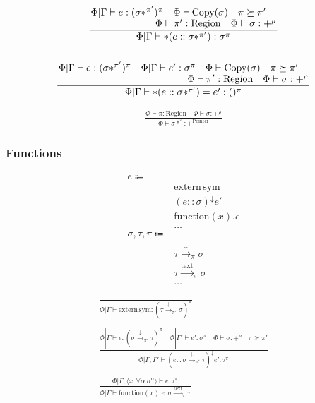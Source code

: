 \documentclass {article}
\begin{document}
\begin{gather*}
\frac
{\splitfrac{\Phi | \Gamma \vdash e : (\sigma *^{\pi'})^\pi \quad \Phi \vdash \text{Copy} (\sigma) \quad \pi \succeq \pi'}
{ \Phi \vdash \pi' : \text{Region} \quad \Phi \vdash \sigma : +^{\rho}}}
{\Phi | \Gamma \vdash * (e :: \sigma *^{\pi'})  : \sigma^\pi} \\
\\
\frac
{\splitfrac{\Phi | \Gamma \vdash e : (\sigma *^{\pi'})^\pi \quad \Phi | \Gamma \vdash e' : \sigma^\pi  \quad \Phi \vdash \text{Copy} (\sigma) \quad \pi \succeq \pi'}
{\Phi \vdash \pi' : \text{Region} \quad \Phi \vdash \sigma : +^{\rho}}}
{\Phi | \Gamma \vdash *(e :: \sigma *^{\pi'}) = e' : ()^\pi }
\end{gather*}

\begin{gather*}
\frac
{\Phi \vdash \pi : \text{Region} \quad \Phi \vdash \sigma : +^{\rho}}
{\Phi \vdash \sigma *^\pi : +^{\text{Pointer}}}
\end{gather*}

\subsubsection{Functions}

\begin{align*}
e \Coloneqq & \\
& \text{extern} \, \text{sym} \tag{Extern Function} \\
& (e :: \sigma) ^\downarrow e' \tag{Function Pointer Application} \\
& \text{function} (x). e \tag{Function Literal} \\
& \dots \\
\sigma, \tau, \pi \Coloneqq & \\
& \tau \xrightarrow{\downarrow}_\pi \sigma \tag{Function Pointer}\\
& \tau \xrightarrow{\text{text}}_\pi \sigma  \tag{Function Literal Type} \\
& \dots
\end{align*}

\begin{gather*}
\frac
{}
{\Phi | \Gamma \vdash \text{extern} \, \text{sym} : (\tau \xrightarrow{\downarrow}_{\pi'} \sigma)^\pi} \\
\\
\frac
{\Phi | \Gamma \vdash e : (\sigma \xrightarrow{\downarrow}_{\pi'} \tau)^\pi \quad \Phi | \Gamma' \vdash e' : \sigma^\pi \quad \Phi \vdash \sigma : +^{\rho} \quad \pi \succeq \pi'}
{\Phi | \Gamma, \Gamma' \vdash (e :: \sigma \xrightarrow{\downarrow}_{\pi'} \tau)^\downarrow e' : \tau^\pi} \\
\\
\frac
{\Phi | \Gamma, \langle x : \forall \alpha. \sigma^\alpha \rangle \vdash e : \tau^\pi}
{\Phi | \Gamma \vdash \text{function}(x). e : \sigma \xrightarrow{\text{text}}_\pi \tau} \\
\end{gather*}
\end{document}
